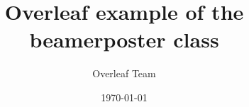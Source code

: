 \documentclass{beamer}
\title[Beamer Poster]{Overleaf example of the beamerposter class}
\author[welcome@overleaf.com]{Overleaf Team}
\institute[Overleaf University]
  {The Overleaf institute, Learn faculty}
\date{\today}
\begin{document}
  \begin{frame}
    \maketitle

  \end{frame}
\end{document}
